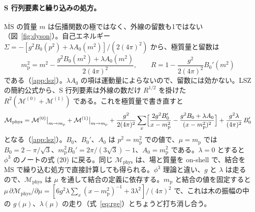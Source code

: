 \documentclass[a4paper,10pt]{ltjsarticle}
\begin{document}
\paragraph{S 行列要素と繰り込みの処方。}$\overline{\mathrm{MS}}$ の質量 $m$ は伝播関数の極ではなく、外線の留数も1ではない（図~\ref{fig:dyson}）。自己エネルギー $\Sigma=-[g^2B_0(p^2)+\lambda A_0(m^2)]/(2(4\pi)^2)$ から、極質量と留数は
\begin{equation}
m_{\mathrm p}^2=m^2-\frac{g^2B_0(m^2)+\lambda A_0(m^2)}{2(4\pi)^2},\qquad R=1-\frac{g^2}{2(4\pi)^2}B_0'(m^2)
\label{eq:mpole}
\end{equation}
である（\ref{app:lsz}）。$\lambda A_0$ の項は運動量によらないので、留数には効かない。LSZ の簡約公式から、S 行列要素は外線の数だけ $R^{1/2}$ を掛けた $R^2(\mathcal{M}^{(0)}+\mathcal{M}^{(1)})$ である。これを極質量で書き直すと
\begin{equation}
\mathcal{M}_{\mathrm{phys}}=\mathcal{M}^{(0)}\big|_{m\to m_{\mathrm p}}+\mathcal{M}^{(1)}\big|_{m\to m_{\mathrm p}}
+\frac{g^2}{2(4\pi)^2}\sum_x\Bigl[\frac{2g^2B_0'}{x-m_{\mathrm p}^2}-\frac{g^2B_0+\lambda A_0}{(x-m_{\mathrm p}^2)^2}\Bigr]+\frac{g^2\lambda}{(4\pi)^2}\,B_0'
\label{eq:Mphys}
\end{equation}
となる（\ref{app:lsz}）。$B_0$、$B_0'$、$A_0$ は $p^2=m_{\mathrm p}^2$ での値で、$\mu=m_{\mathrm p}$ では $B_0=2-\pi/\sqrt3$、$m_{\mathrm p}^2B_0'=2\pi/(3\sqrt3)-1$、$A_0=m_{\mathrm p}^2$ である。$\lambda=0$ とすると $\phi^3$ のノートの式 (20) に戻る。同じ $\mathcal{M}_{\mathrm{phys}}$ は、場と質量を on-shell で、結合を $\overline{\mathrm{MS}}$ で繰り込む処方で直接計算しても得られる。$\phi^3$ 理論と違い、$g$ と $\lambda$ は走るので、$\mathcal{M}_{\mathrm{phys}}$ は $\mu$ を通して結合の定義に依存する。$m_{\mathrm p}$ と結合の値を固定すると $\mu\,\partial\mathcal{M}_{\mathrm{phys}}/\partial\mu=[6g^2\lambda\sum_x(x-m_{\mathrm p}^2)^{-1}+3\lambda^2]/(4\pi)^2$ で、これは木の振幅の中の $g(\mu)$、$\lambda(\mu)$ の走り（式~\eqref{eq:rge}）とちょうど打ち消し合う。
\end{document}
